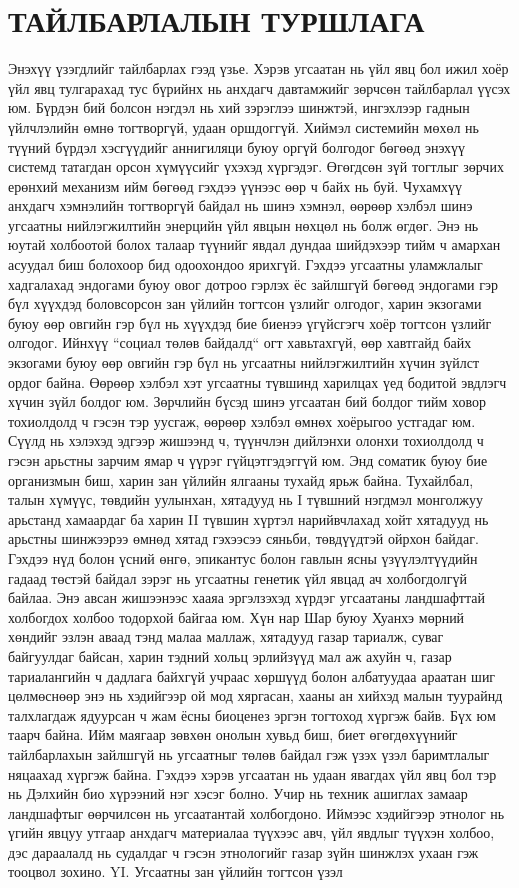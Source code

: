 \section{ТАЙЛБАРЛАЛЫН ТУРШЛАГА}
Энэхүү үзэгдлийг тайлбарлах гээд үзье. Хэрэв угсаатан нь үйл явц бол ижил хоёр үйл явц тулгарахад тус бүрийнх нь анхдагч давтамжийг зөрчсөн тайлбарлал үүсэх юм. Бүрдэн бий болсон нэгдэл нь хий зэрэглээ шинжтэй, ингэхлээр гаднын үйлчлэлийн өмнө тогтворгүй, удаан оршдоггүй. Хиймэл системийн мөхөл нь түүний бүрдэл хэсгүүдийг аннигиляци буюу оргүй болгодог бөгөөд энэхүү системд татагдан орсон хүмүүсийг үхэхэд хүргэдэг. Өгөгдсөн зүй тогтлыг зөрчих ерөнхий механизм ийм бөгөөд гэхдээ үүнээс өөр ч байх нь буй. Чухамхүү анхдагч хэмнэлийн тогтворгүй байдал нь шинэ хэмнэл, өөрөөр хэлбэл шинэ угсаатны нийлэгжилтийн энерцийн үйл явцын нөхцөл нь болж өгдөг. Энэ нь юутай холбоотой болох талаар түүнийг явдал дундаа шийдэхээр тийм ч амархан асуудал биш болохоор бид одоохондоо ярихгүй. Гэхдээ угсаатны уламжлалыг хадгалахад эндогами буюу овог дотроо гэрлэх ёс зайлшгүй бөгөөд эндогами гэр бүл хүүхдэд боловсорсон зан үйлийн тогтсон үзлийг олгодог, харин экзогами буюу өөр овгийн гэр бүл нь хүүхдэд бие биенээ үгүйсгэгч хоёр тогтсон үзлийг олгодог. Ийнхүү “социал төлөв байдалд“ огт хавьтахгүй, өөр хавтгайд байх экзогами буюу өөр овгийн гэр бүл нь угсаатны нийлэгжилтийн хүчин зүйлст ордог байна. Өөрөөр хэлбэл хэт угсаатны түвшинд харилцах үед бодитой эвдлэгч хүчин зүйл болдог юм. Зөрчлийн бүсэд шинэ угсаатан бий болдог тийм ховор тохиолдолд ч гэсэн тэр уусгаж, өөрөөр хэлбэл өмнөх хоёрыгоо устгадаг юм. Сүүлд нь хэлэхэд эдгээр жишээнд ч, түүнчлэн дийлэнхи олонхи тохиолдолд ч гэсэн арьстны зарчим ямар ч үүрэг гүйцэтгэдэггүй юм. Энд соматик буюу бие организмын биш, харин зан үйлийн ялгааны тухайд ярьж байна. Тухайлбал, талын хүмүүс, төвдийн уулынхан, хятадууд нь I түвшний нэгдмэл монголжуу арьстанд хамаардаг ба харин II түвшин хүртэл нарийвчлахад хойт хятадууд нь арьстны шинжээрээ өмнөд хятад гэхээсээ сяньби, төвдүүдтэй ойрхон байдаг. Гэхдээ нүд болон үсний өнгө, эпикантус болон гавлын ясны үзүүлэлтүүдийн гадаад төстэй байдал зэрэг нь угсаатны генетик үйл явцад ач холбогдолгүй байлаа.
Энэ авсан жишээнээс хааяа эргэлзэхэд хүрдэг угсаатаны ландшафттай холбогдох холбоо тодорхой байгаа юм. Хүн нар Шар буюу Хуанхэ мөрний хөндийг эзлэн аваад тэнд малаа маллаж, хятадууд газар тариалж, суваг байгуулдаг байсан, харин тэдний хольц эрлийзүүд мал аж ахуйн ч, газар тариалангийн ч дадлага байхгүй учраас хөршүүд болон албатуудаа араатан шиг цөлмөснөөр энэ нь хэдийгээр ой мод хяргасан, хааны ан хийхэд малын туурайнд талхлагдаж ядуурсан ч жам ёсны биоценез эргэн тогтоход хүргэж байв. Бүх юм таарч байна.
Ийм маягаар зөвхөн онолын хувьд биш, биет өгөгдөхүүнийг тайлбарлахын зайлшгүй нь угсаатныг төлөв байдал гэж үзэх үзэл баримтлалыг няцаахад хүргэж байна. Гэхдээ хэрэв угсаатан нь удаан явагдах үйл явц бол тэр нь Дэлхийн био хүрээний нэг хэсэг болно. Учир нь техник ашиглах замаар ландшафтыг өөрчилсөн нь угсаатантай холбогдоно. Иймээс хэдийгээр этнолог нь үгийн явцуу утгаар анхдагч материалаа түүхээс авч, үйл явдлыг түүхэн холбоо, дэс дараалалд нь судалдаг ч гэсэн этнологийг газар зүйн шинжлэх ухаан гэж тооцвол зохино.
YI. Угсаатны зан үйлийн тогтсон үзэл
